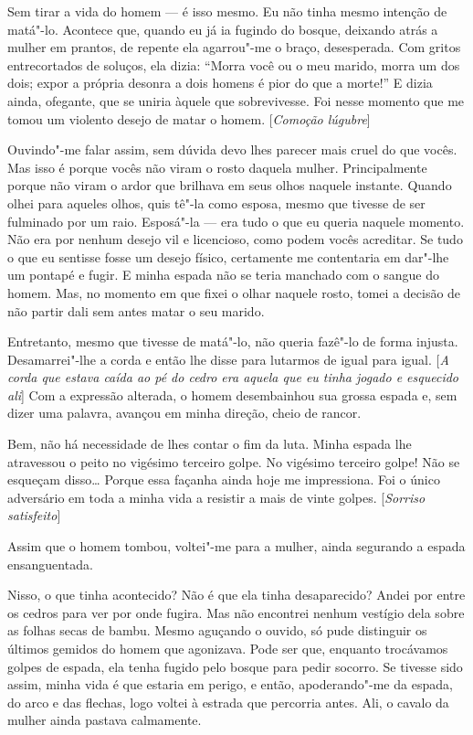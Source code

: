 Sem tirar a vida do homem --- é isso mesmo. Eu não tinha mesmo intenção de
matá"-lo. Acontece que, quando eu já ia fugindo do bosque, deixando
atrás a mulher em prantos, de repente ela agarrou"-me o braço,
desesperada. Com gritos entrecortados de soluços, ela dizia: ``Morra
você ou o meu marido, morra um dos dois; expor a própria desonra a dois
homens é pior do que a morte!'' E dizia ainda, ofegante, que se uniria
àquele que sobrevivesse. Foi nesse momento que me tomou  um violento
desejo de matar o homem. [\textit{Comoção lúgubre}]

Ouvindo"-me falar assim, sem dúvida devo lhes parecer mais cruel do que
vocês. Mas isso é porque vocês não viram o rosto daquela mulher.
Principalmente porque não viram o ardor que brilhava em seus olhos
naquele instante. Quando olhei para aqueles olhos, quis tê"-la como
esposa, mesmo que tivesse de ser fulminado por um raio. Esposá"-la --- era
tudo o que eu queria naquele momento. Não era por nenhum desejo vil e
licencioso, como podem vocês acreditar. Se tudo o que eu sentisse fosse
um desejo físico, certamente me contentaria em dar"-lhe um pontapé e
fugir. E minha espada não se teria manchado com o sangue do homem. Mas,
no momento em que fixei o olhar naquele rosto, tomei a decisão de não
partir dali sem antes matar o seu marido.

Entretanto, mesmo que tivesse de matá"-lo, não queria fazê"-lo de forma injusta. 
Desamarrei"-lhe a corda e então lhe disse para lutarmos de igual para igual. [\textit{A corda que estava caída ao pé do cedro era aquela que eu tinha jogado e esquecido ali}]
Com a expressão alterada, o homem desembainhou sua grossa espada e, sem dizer uma palavra, 
avançou em minha direção, cheio de rancor.

Bem, não há necessidade de lhes contar o fim da luta. Minha espada lhe
atravessou o peito no vigésimo terceiro golpe. No vigésimo terceiro
golpe! Não se esqueçam disso\ldots{} Porque essa façanha ainda hoje me
impressiona. Foi o único adversário em toda a minha vida a resistir a
mais de vinte golpes. [\textit{Sorriso satisfeito}]

Assim que o homem tombou, voltei"-me para a mulher, ainda segurando a
espada ensanguentada. 

Nisso, o que tinha acontecido? Não é que ela tinha desaparecido? 
Andei por entre os cedros para ver por onde fugira. Mas
não encontrei nenhum vestígio dela sobre as folhas secas de bambu. Mesmo
aguçando o ouvido, só pude distinguir os últimos gemidos do homem que
agonizava. Pode ser que, enquanto trocávamos golpes de espada, ela
tenha fugido pelo bosque para pedir socorro. Se tivesse sido assim,
minha vida é que estaria em perigo, e então, apoderando"-me da espada,
do arco e das flechas, logo voltei à estrada que percorria antes. Ali,
o cavalo da mulher ainda pastava calmamente.

